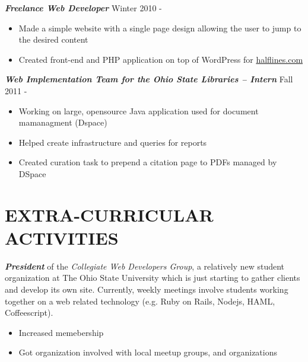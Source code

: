 \documentclass[line,margin=.2,letterpaper]{resume}
\begin{document}
\begin{resume}
	{\sl\textbf{Freelance Web Developer}} \hfill Winter 2010 - \\
	\vspace{-8pt}
	 \begin{itemize}  
         \item Made a simple website with a single page design allowing the user
         to jump to the desired content
         \item Created front-end and PHP application on top of WordPress for
         \href{http://halflines.com/}{halflines.com}
	 \end{itemize} 
    {\sl\textbf{Web Implementation Team for the Ohio State Libraries -- Intern}}
    \hfill Fall 2011 - \\
	\vspace{-8pt}
    \begin{itemize}  
        \item Working on large, opensource Java application used for document
        mamanagment (Dspace)
        \item Helped create infrastructure and queries for reports
        \item Created curation task to prepend a citation page to PDFs managed
        by DSpace
    \end{itemize} 
                 
\section{\uppercase{Extra-Curricular Activities}}             
    \emph{\textbf{President}} of the \emph{Collegiate Web Developers Group}, a
    relatively new student organization at The Ohio State University which is
    just starting to gather clients and develop its own site.  Currently, weekly
    meetings involve students working together on a web related technology (e.g.
    Ruby on Rails, Nodejs, HAML, Coffeescript).\\
    \vspace{-8pt}
	\begin{itemize}
	    \item Increased memebership
        \item Got organization involved with local meetup groups, and
        organizations
	\end{itemize}
 
\end{resume}
\end{document}
